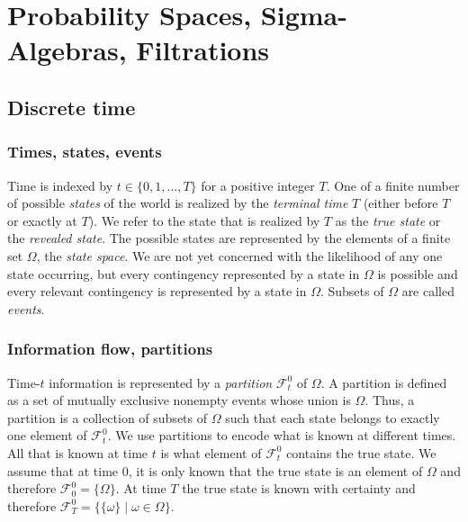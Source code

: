 \documentclass[\topdir/lecture\_notes.tex]{subfiles}
\begin{document}
\section{Probability Spaces, Sigma-Algebras, Filtrations}
\subsection{Discrete time}
\subsubsection*{Times, states, events}
Time is indexed by \(t \in \{0,1, \ldots, T\}\) for a positive integer \(T\). One of a finite number of possible \emph{states} of the world is realized by the \emph{terminal time} \(T\) (either before \(T\) or exactly at \(T\)). We refer to the state that is realized by \(T\) as the \emph{true state} or the \emph{revealed state}. The possible states are represented by the elements of a finite set \(\Omega\), the \emph{state space}. We are not yet concerned with the likelihood of any one state occurring, but every contingency represented by a state in \(\Omega\) is possible and every relevant contingency is represented by a state in \(\Omega\). Subsets of \(\Omega\) are called \emph{events}.
\subsubsection*{Information flow, partitions}
Time-\(t\) information is represented by a \emph{partition} \(\mathcal{F}_{t}^{0}\) of \(\Omega\). A partition is defined as a set of mutually exclusive nonempty events whose union is \(\Omega\). Thus, a partition is a collection of subsets of \(\Omega\) such that each state belongs to exactly one element of \(\mathcal{F}_{t}^{0}\). We use partitions to encode what is known at different times. All that is known at time \(t\) is what element of \(\mathcal{F}_{t}^{0}\) contains the true state. We assume that at time \(0\), it is only known that the true state is an element of \(\Omega\) and therefore \(\mathcal{F}_{0}^{0}=\{\Omega\}\). At time \(T\) the true state is known with certainty and therefore \(\mathcal{F}_{T}^{0}=\{\{\omega\} \mid \omega \in \Omega\}\).
\end{document}
